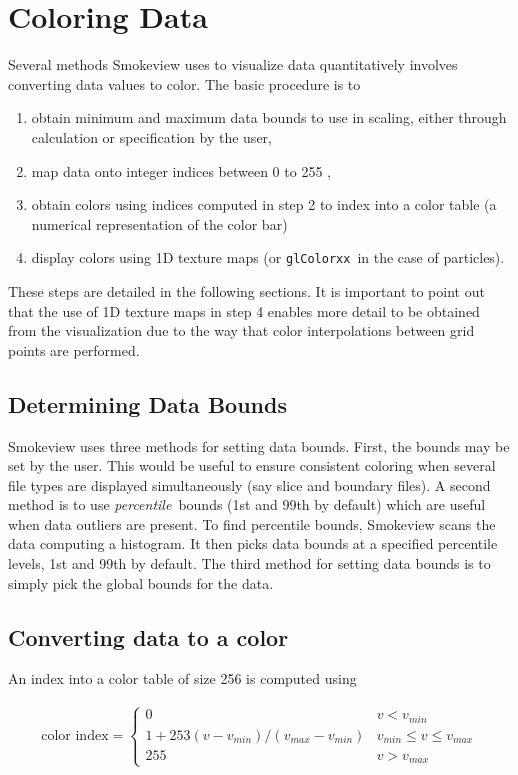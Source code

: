 \documentclass[11pt,twoside]{book}
\begin{document}
%
%

\section{Coloring Data}
Several methods Smokeview uses to visualize data quantitatively
involves converting data values to color. The basic procedure is
to
\begin{enumerate}
\item obtain minimum and maximum data bounds to use in scaling, either through calculation or specification by the user,
\item map data onto integer indices between 0 to 255 ,
\item obtain colors using indices computed in step 2 to index into a color table (a numerical representation of the color bar)
\item display colors using 1D texture maps (or {\tt glColorxx}\ in the case of particles).
\end{enumerate}
These steps are detailed in the following sections.   It is important to point out that the use of 1D texture maps in step 4 enables more detail to be obtained from the visualization due to the way that color interpolations between grid points are performed.

\subsection{Determining Data Bounds}Smokeview uses three methods for setting data bounds.  First, the bounds may be set by the user.  This would be useful to ensure consistent coloring when several file types are displayed simultaneously (say slice and boundary files).  A second method is to use {\em percentile}\ bounds (1st and 99th by default) which are useful when data outliers are present.  To find percentile bounds, Smokeview scans the data computing a histogram.  It then picks data bounds at a specified percentile levels, 1st and 99th by default.  The third method for setting data bounds is to simply pick the global bounds for the data.

\subsection{Converting data to a color}
An index into a color table of size 256 is computed using

\begin{eqnarray*}
\mbox{color index}=\left\{
\begin{array}{ll}
  0 & v < v_{min}\\
  1+253(v-v_{min})/(v_{max}-v_{min}) & v_{min}\le v \le v_{max} \\
  255 & v > v_{max}
\end{array}
\right.
\end{eqnarray*}
\end{document}
